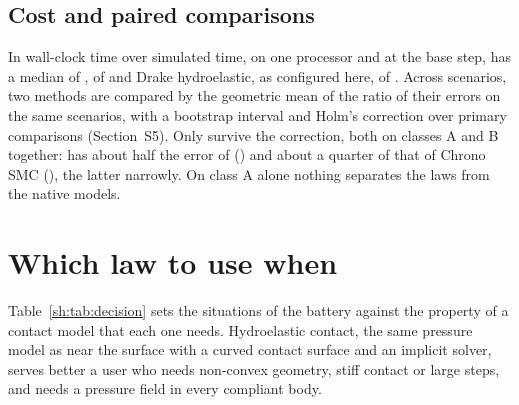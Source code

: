 \subsection{Cost and paired comparisons}\label{sh:cost}

In wall-clock time over simulated time, on one processor and at the base step, 
has a median of ,  of
 and Drake hydroelastic, as configured here, of
. Across scenarios, two methods are compared by the geometric mean
of the ratio of their errors on the same scenarios, with a bootstrap interval and Holm's
correction over  primary comparisons (Section~S5). Only
 survive the correction, both on classes A and B together:
 has about half the error of 
() and about a quarter of that of Chrono SMC
(), the latter narrowly. On class A alone nothing
separates the laws from the native models.

\section{Which law to use when}\label{sh:which}

Table~\ref{sh:tab:decision} sets the situations of the battery
against the property of a contact model that each one needs. Hydroelastic contact, the same
pressure model as  near the surface with a curved contact surface and an
implicit solver, serves better a user who needs non-convex geometry, stiff contact or large
steps, and needs a pressure field in every compliant body.

